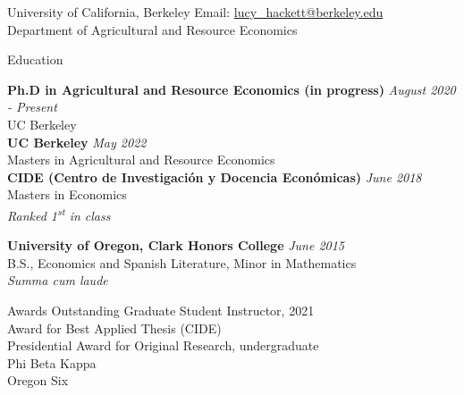 \documentclass{resume} %
\begin{document}
\begin{rSection}{}
University of California, Berkeley \hfill Email:  \href{mailto:lucy\_hackett@berkeley.edu}{lucy\_hackett@berkeley.edu}\\
Department of Agricultural and Resource Economics \\
\end{rSection}


\begin{rSection}{Education}

{\bf Ph.D in Agricultural and Resource Economics (in progress)} \hfill {\em August 2020 - Present} 
\\ UC Berkeley\hfill \\

{\bf UC Berkeley} \hfill {\em May 2022} 
\\ Masters in Agricultural and Resource Economics\hfill\\

{\bf CIDE (Centro de Investigación y Docencia Económicas)} \hfill {\em June 2018} 
\\ Masters in Economics\hfill\\
\textit{Ranked 1\textsuperscript{st} in class}
\vspace{0.1cm}

{\bf University of Oregon, Clark Honors College} \hfill {\em June 2015} 
\\ B.S., Economics and Spanish Literature, Minor in Mathematics  \hfill\\
\textit{Summa cum laude}
\end{rSection}


\begin{rSection}{Awards} \itemsep -2pt
Outstanding Graduate Student Instructor, 2021 \\
Award for Best Applied Thesis (CIDE)\\
Presidential Award for Original Research, undergraduate \\
Phi Beta Kappa\\
Oregon Six
\end{rSection}
\end{document}
